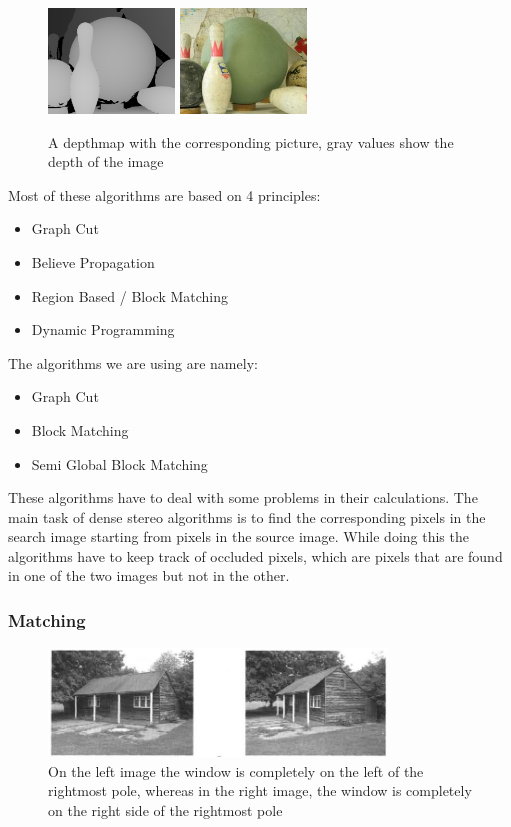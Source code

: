\documentclass[a4paper]{article}
\begin{document}
\begin{figure} \centering
\includegraphics[width=0.3\textwidth]{depthmap}
\includegraphics[width=0.3\textwidth]{depthmap_original}
\caption{A depthmap with the corresponding picture, gray values show
  the depth of the image}
\label{dm_example}
\end{figure}

Most of these algorithms are based on 4 principles:
\begin{itemize}
\item Graph Cut
\item Believe Propagation
\item Region Based / Block Matching
\item Dynamic Programming
\end{itemize}

The algorithms we are using are namely:
\begin{itemize}
\item Graph Cut
\item Block Matching
\item Semi Global Block Matching
\end{itemize}

These algorithms have to deal with some problems in their
calculations. The main task of dense stereo algorithms is to find the
corresponding pixels in the search image starting from pixels in the
source image. While doing this the algorithms have to keep track of
occluded pixels, which are pixels that are found in one of the two images but
not in the other. 

\subsubsection{Matching}
\begin{figure} [h!tb]
\centering
\includegraphics[width=0.8\textwidth]{matching_problems_direction}
\caption{On the left image the window is completely on the left of the
  rightmost pole, whereas in the right image, the window is completely
  on the right side of the rightmost pole}
\label{dirprob}
\end{figure}
\end{document}
